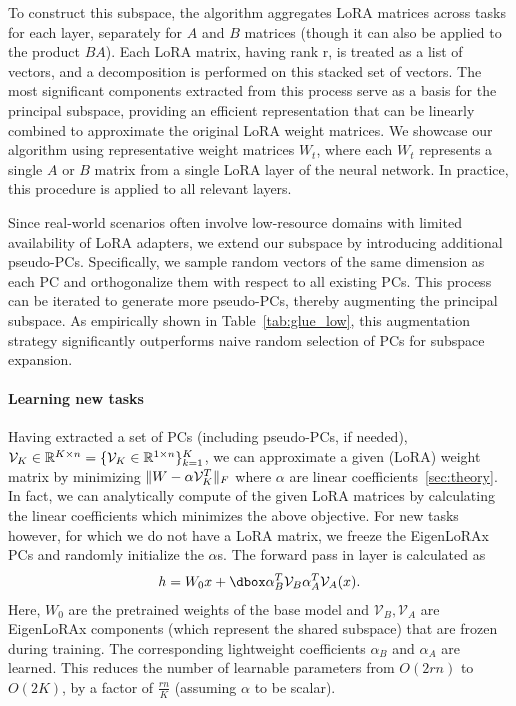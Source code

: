To construct this subspace, the algorithm aggregates LoRA matrices across tasks for each layer, separately for $A$ and $B$ matrices (though it can also be applied to the product $BA$). Each LoRA matrix, having rank r, is treated as a list of vectors, and a decomposition is performed on this stacked set of vectors. The most significant components extracted from this process serve as a basis for the principal subspace, providing an efficient representation that can be linearly combined to approximate the original LoRA weight matrices. We showcase our algorithm using representative weight matrices $W_t$, where each $W_t$ represents a single $A$ or $B$ matrix from a single LoRA layer of the neural network. In practice, this procedure is applied to all relevant layers.

Since real-world scenarios often involve low-resource domains with limited availability of LoRA adapters, we extend our subspace by introducing additional pseudo-PCs. Specifically, we sample random vectors of the same dimension as each PC and orthogonalize them with respect to all existing PCs. This process can be iterated to generate more pseudo-PCs, thereby augmenting the principal subspace. As empirically shown in Table~\ref{tab:glue_low}, this augmentation strategy significantly outperforms naive random selection of PCs for subspace expansion.

\paragraph{Learning new tasks}\label{method:learningnewelora} Having extracted a set of PCs (including pseudo-PCs, if needed), $\mathcal{V}_K \in\mathbb{R}^{K\times n}=\{\mathcal{V}_{K}\in\mathbb{R}^{1\times n}\}^K_{k=1}$, we can approximate a given (LoRA) weight matrix by minimizing $\lVert W - \alpha\mathcal{V}^T_{K}\lVert_F$ where $\alpha$ are linear coefficients~\cref{sec:theory}. In fact, we can analytically compute of the given LoRA matrices by calculating the linear coefficients which minimizes the above objective. For new tasks however, for which we do not have a LoRA matrix, we freeze the EigenLoRAx PCs and randomly initialize the $\alpha$s. The forward pass in layer is calculated as 
\begin{align}
    h = W_0x + \dboxed{\alpha_B^T \mathcal{V}_B \alpha_A^T \mathcal{V}_A(x)}.
\end{align}
Here, $W_0$ are the pretrained weights of the base model and $\mathcal{V}_B, \mathcal{V}_A$ are EigenLoRAx components (which represent the shared subspace) that are frozen during training. The corresponding lightweight coefficients $\alpha_B$ and $\alpha_A$ are learned. This reduces the number of learnable parameters from $O(2rn)$ to $O(2K)$, by a factor of $\frac{rn}{K}$ (assuming $\alpha$ to be scalar). 


